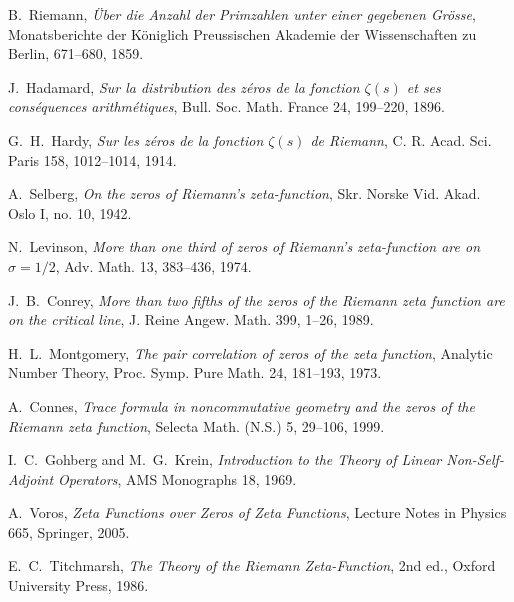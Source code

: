 \documentclass[12pt]{article}
\theoremstyle{definition}
\theoremstyle{remark}
\begin{document}
\begin{thebibliography}{99}
B.~Riemann, \emph{\"Uber die Anzahl der Primzahlen unter einer gegebenen 
Gr\"osse}, Monatsberichte der K\"oniglich Preussischen Akademie der 
Wissenschaften zu Berlin, 671--680, 1859.

J.~Hadamard, \emph{Sur la distribution des z\'eros de la fonction $\zeta(s)$ 
et ses cons\'equences arithm\'etiques}, Bull. Soc. Math. France 24, 199--220, 1896.

G.~H.~Hardy, \emph{Sur les z\'eros de la fonction $\zeta(s)$ de Riemann}, 
C. R. Acad. Sci. Paris 158, 1012--1014, 1914.

A.~Selberg, \emph{On the zeros of Riemann's zeta-function}, 
Skr. Norske Vid. Akad. Oslo I, no. 10, 1942.

N.~Levinson, \emph{More than one third of zeros of Riemann's zeta-function 
are on $\sigma = 1/2$}, Adv. Math. 13, 383--436, 1974.

J.~B.~Conrey, \emph{More than two fifths of the zeros of the Riemann zeta 
function are on the critical line}, J. Reine Angew. Math. 399, 1--26, 1989.

H.~L.~Montgomery, \emph{The pair correlation of zeros of the zeta function}, 
Analytic Number Theory, Proc. Symp. Pure Math. 24, 181--193, 1973.

A.~Connes, \emph{Trace formula in noncommutative geometry and the zeros of 
the Riemann zeta function}, Selecta Math. (N.S.) 5, 29--106, 1999.

I.~C.~Gohberg and M.~G.~Krein, \emph{Introduction to the Theory of
Linear Non-Self-Adjoint Operators}, AMS Monographs 18, 1969.

A.~Voros, \emph{Zeta Functions over Zeros of Zeta Functions},
Lecture Notes in Physics 665, Springer, 2005.

E.~C.~Titchmarsh, \emph{The Theory of the Riemann Zeta-Function},
2nd ed., Oxford University Press, 1986.
\end{thebibliography}

\end{document}
